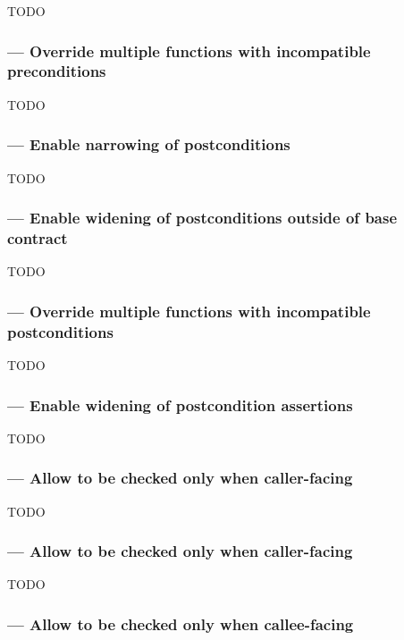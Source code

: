 TODO

\subsubsection{ --- Override multiple functions with incompatible preconditions}

TODO



\subsubsection{ --- Enable narrowing of postconditions}

TODO

\subsubsection{ --- Enable widening of postconditions outside of base contract}

TODO

\subsubsection{ --- Override multiple functions with incompatible postconditions}

TODO

\subsubsection{ --- Enable widening of postcondition assertions}

TODO


\subsubsection{ --- Allow  to be checked only when caller-facing}

TODO

\subsubsection{ --- Allow  to be checked only when caller-facing}

TODO

\subsubsection{ --- Allow  to be checked only when callee-facing}

